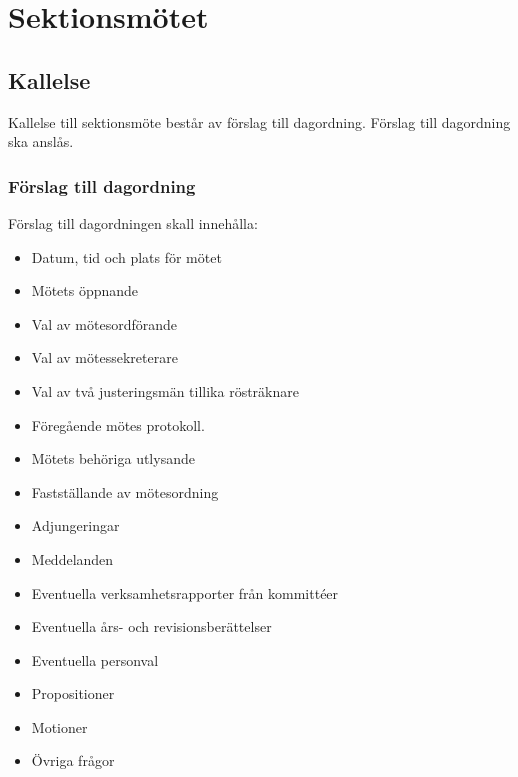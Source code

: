 \section{Sektionsmötet}

\subsection{Kallelse} 
Kallelse till sektionsmöte består av förslag till dagordning. Förslag till
dagordning ska anslås.

\subsubsection{Förslag till dagordning}
Förslag till dagordningen skall innehålla:
\begin{itemize}  
  \item Datum, tid och plats för mötet 
  \item Mötets öppnande 
  \item Val av mötesordförande 
  \item Val av mötessekreterare 
  \item Val av två justeringsmän tillika rösträknare 
  \item Föregående mötes protokoll. 
  \item Mötets behöriga utlysande 
  \item Fastställande av mötesordning 
  \item Adjungeringar 
  \item Meddelanden 
  \item Eventuella verksamhetsrapporter från kommittéer 
  \item Eventuella års- och revisionsberättelser 
  \item Eventuella personval 
  \item Propositioner 
  \item Motioner 
  \item Övriga frågor 
\end{itemize}

